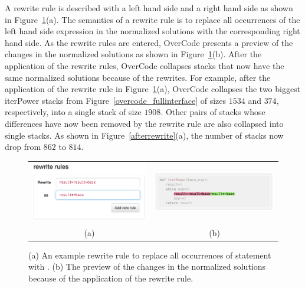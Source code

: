 A rewrite rule is described with a left hand side and a right hand side as shown in Figure~\ref{rewriterule}(a). The semantics of a rewrite rule is to replace all occurrences of the left hand side expression in the normalized solutions with the corresponding right hand side. As the rewrite rules are entered, OverCode presents a preview of the changes in the normalized solutions as shown in Figure~\ref{rewriterule}(b). After the application of the rewrite rules, OverCode collapses stacks that now have the same normalized solutions because of the rewrites. For example, after the application of the rewrite rule in Figure~\ref{rewriterule}(a), OverCode collapses the two biggest iterPower stacks from Figure~\ref{overcode_fullinterface} of sizes $1534$ and $374$, respectively, into a single stack of size $1908$. Other pairs of stacks whose differences have now been removed by the rewrite rule are also collapsed into single stacks. As shown in Figure~\ref{afterrewrite}(a), the number of stacks now drop from $862$ to $814$.

\begin{figure}[htpb]
\begin{tabular}{c | c}
\begin{minipage}{.5\linewidth}
\centering
\includegraphics[scale=0.45]{Body/figures/overcode/rewriteRuleScreenshot.png}
\end{minipage}
&
\begin{minipage}{.5\linewidth}
\centering
\includegraphics[scale=0.40]{Body/figures/overcode/rewritePreviewScreenShot.png}
\end{minipage}
\\
(a) & (b)
\end{tabular}
\caption{(a) An example rewrite rule to replace all occurrences of statement  with . (b) The preview of the changes in the normalized solutions because of the application of the rewrite rule.}
\label{rewriterule}
\end{figure}

